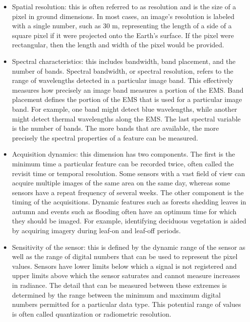     \begin{itemize}
        \item Spatial resolution: this is often referred to as resolution and is the size of a pixel in ground dimensions. 
        In most cases, an image's resolution is labeled with a single number, such as 30 m, representing the length of a side of a square pixel if it were projected onto the Earth's surface.
        If the pixel were rectangular, then the length and width of the pixel would be provided.
        \item Spectral characteristics: this includes bandwidth, band placement, and the number of bands.
        Spectral bandwidth, or spectral resolution, refers to the range of wavelengths detected in a particular image band.
        This effectively measures how precisely an image band measures a portion of the EMS.
        Band placement defines the portion of the EMS that is used for a particular image band.
        For example, one band might detect blue wavelengths, while another might detect thermal wavelengths along the EMS.
        The last spectral variable is the number of bands. The more bands that are available, the more precisely the spectral properties of a feature can be measured.
        \item Acquisition dynamics: this dimension has two components. The first is the minimum time a particular feature can be recorded twice, often called the revisit time or temporal resolution.
        Some sensors with a vast field of view can acquire multiple images of the same area on the same day, whereas some sensors have a repeat frequency of several weeks.
        The other component is the timing of the acquisitions. 
        Dynamic features such as forests shedding leaves in autumn and events such as flooding often have an optimum time for which they should be imaged.
        For example, identifying deciduous vegetation is aided by acquiring imagery during leaf-on and leaf-off periods.
        \item Sensitivity of the sensor: this is defined by the dynamic range of the sensor as well as the range of digital numbers that can be used to represent the pixel values.
        Sensors have lower limits below which a signal is not registered and upper limits above which the sensor saturates and cannot measure increases in radiance.
        The detail that can be measured between these extremes is determined by the range between the minimum and maximum digital numbers permitted for a particular data type.
        This potential range of values is often called quantization or radiometric resolution.
    \end{itemize}
    
